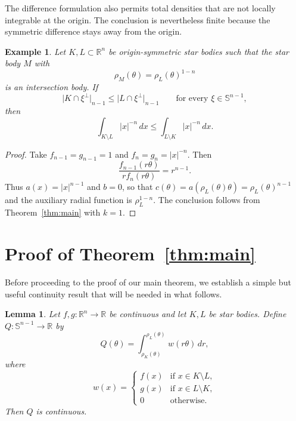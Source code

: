 \documentclass{amsart}
\newtheorem{lemma}[theorem]{Lemma}
\newtheorem{example}[theorem]{Example}
\theoremstyle{remark}
\newcommand{\R}{\mathbb{R}}
\newcommand{\Sph}{\mathbb{S}}
\newcommand{\dd}{\,d}
\newcommand{\vol}[2][n]{\lvert #2\rvert_{#1}}
\begin{document}
The difference formulation also permits total densities that are not locally
integrable at the origin. The conclusion is nevertheless finite because the
symmetric difference stays away from the origin.

\begin{example}\label{ex:singular}
Let $K,L\subset\R^n$ be origin-symmetric star bodies such that the star body
$M$ with
\[
 \rho_M(\theta)=\rho_L(\theta)^{1-n}
\]
is an intersection body. If
\[
 \vol[n-1]{K\cap\xi^\perp}
 \leq\vol[n-1]{L\cap\xi^\perp}
 \qquad\text{for every }\xi\in\Sph^{n-1},
\]
then
\[
 \int_{K\setminus L}|x|^{-n}\dd x
 \leq
 \int_{L\setminus K}|x|^{-n}\dd x.
\]
\end{example}

\begin{proof}
Take $f_{n-1}=g_{n-1}=1$ and $f_n=g_n=|x|^{-n}$. Then
\[
 \frac{f_{n-1}(r\theta)}{r f_n(r\theta)}=r^{n-1}.
\]
Thus $a(x)=|x|^{n-1}$ and $b=0$, so that
$c(\theta)=a(\rho_L(\theta)\theta)=\rho_L(\theta)^{n-1}$ and the auxiliary
radial function is $\rho_L^{1-n}$. The conclusion follows from
Theorem~\ref{thm:main} with $k=1$.
\end{proof}

\section{Proof of Theorem~\ref{thm:main}}
\label{sec:proof}

Before proceeding to the proof of our main theorem, we establish a simple but
useful continuity result that will be needed in what follows.

\begin{lemma}\label{lem:continuity}
Let $f,g:\R^n\to\R$ be continuous and let $K,L$ be star bodies. Define
$Q:\Sph^{n-1}\to\R$ by
\[
 Q(\theta)=\int_{\rho_K(\theta)}^{\rho_L(\theta)}w(r\theta)\dd r,
\]
where
\[
 w(x)=
 \begin{cases}
  f(x)&\text{if }x\in K\setminus L,\\
  g(x)&\text{if }x\in L\setminus K,\\
  0&\text{otherwise.}
 \end{cases}
\]
Then $Q$ is continuous.
\end{lemma}
\end{document}
